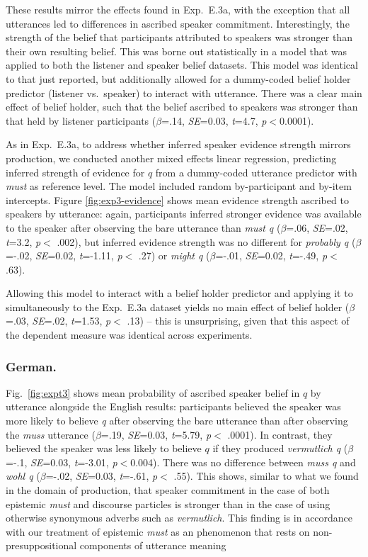 \documentclass[11pt]{article}
\newcommand{\figref}[1]{Figure \ref{#1}}
\begin{document}
These results mirror the effects found in Exp.~E.3a, with the exception that all utterances led to differences in ascribed speaker commitment. Interestingly, the strength of the belief that participants attributed to speakers was stronger than their own resulting belief. This was borne out statistically in a model that was applied to both the listener and speaker belief datasets. This model was identical to that just reported, but additionally allowed for a dummy-coded belief holder predictor (listener vs.~speaker)  to interact with utterance. There was a clear main effect of belief holder, such that the belief ascribed to speakers was stronger than that held by listener participants ($\beta$=.14, \emph{SE}=0.03, \emph{t}=4.7, \emph{p}$<$0.0001). 

As in Exp.~E.3a, to address whether inferred speaker evidence strength mirrors production, we conducted another mixed effects linear regression, predicting inferred strength of evidence for $q$ from a dummy-coded utterance predictor with \emph{must} as reference level. The model included random by-participant and by-item intercepts.  \figref{fig:exp3-evidence} shows mean evidence strength ascribed to speakers by utterance:  again, participants inferred stronger evidence was available to the speaker after observing the bare utterance than \emph{must q} ($\beta$=.06, \emph{SE}=.02, \emph{t}=3.2, \emph{p}$<$ .002), but inferred evidence strength was no different for \emph{probably q} ($\beta$=-.02, \emph{SE}=0.02, \emph{t}=-1.11, \emph{p}$<$ .27) or \emph{might q} ($\beta$=-.01, \emph{SE}=0.02, \emph{t}=-.49, \emph{p}$<$ .63).

Allowing this model to interact with a belief holder predictor and applying it to simultaneously to the Exp.~E.3a dataset yields no main effect of belief holder ($\beta$=.03, \emph{SE}=.02, \emph{t}=1.53, \emph{p}$<$ .13) -- this is unsurprising, given that this aspect of the dependent measure was identical across experiments.

\subsubsection{German.} Fig.~\ref{fig:expt3} shows mean probability of ascribed speaker belief in $q$ by utterance alongside the English results: participants believed the speaker was more likely to believe \emph{q}  after observing the bare utterance than after observing the \emph{muss} utterance  ($\beta$=.19, \emph{SE}=0.03, \emph{t}=5.79, \emph{p}$<$ .0001). In contrast, they believed the speaker was less likely to believe $q$ if they produced \emph{vermutlich q} ($\beta$=-.1, \emph{SE}=0.03, \emph{t}=-3.01, \emph{p}$<$0.004). There was no difference between \emph{muss q} and \emph{wohl q} ($\beta$=-.02, \emph{SE}=0.03, \emph{t}=-.61, \emph{p}$<$ .55).  This shows, similar to what we found in the domain of production, that speaker commitment in the case of both epistemic \emph{must} and discourse particles is stronger than in the case of using otherwise synonymous adverbs such as \emph{vermutlich}. This finding is in accordance with our treatment of epistemic \emph{must} as an phenomenon that rests on non-presuppositional components of utterance meaning
\end{document}
